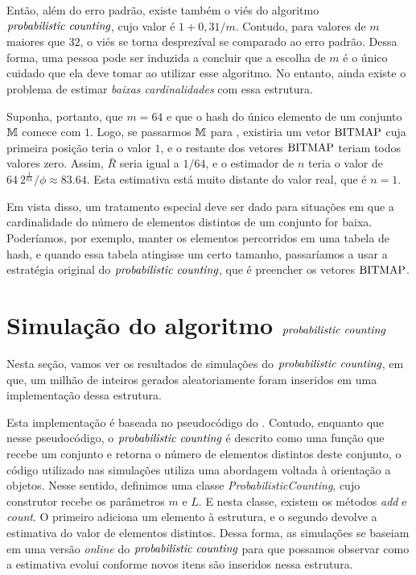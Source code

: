 Então, além do erro padrão, existe também o viés do algoritmo $\textit{probabilistic counting}$, cujo valor é $1 + 0{,}31/m$. Contudo, para 
valores de $m$ maiores que $32$, o viés se torna desprezíval se comparado ao erro padrão. Dessa forma, uma pessoa pode 
ser induzida a concluir que a escolha de $m$ é o único cuidado que ela deve tomar ao utilizar esse algoritmo. No 
entanto, ainda existe o problema de estimar \textit{baixas cardinalidades} com essa estrutura.

Suponha, portanto, que $m = 64$ e que o hash do único elemento de um conjunto $\mathbb{M}$ comece com $1$. Logo, se passarmos 
$\mathbb{M}$ para , existiria um vetor $\text{BITMAP}$ cuja primeira posição teria o valor $1$, e o 
restante dos vetores $\text{BITMAP}$ teriam todos valores zero. Assim, $\bar{R}$ seria igual a $1/64$, e o estimador de $n$ 
teria o valor de $64 \ 2^{\frac{1}{64}}/\phi \approx 83.64$. Esta estimativa está muito distante do valor real, que é 
$n = 1$.

Em vista disso, um tratamento especial deve ser dado para situações em que a cardinalidade do número de elementos 
distintos de um conjunto for baixa. Poderíamos, por exemplo, manter os elementos percorridos em uma tabela de hash, e 
quando essa tabela atingisse um certo tamanho, passaríamos a usar a estratégia original do $\textit{probabilistic counting}$, que é preencher
os vetores $\text{BITMAP}$.  

\section{Simulação do algoritmo $\textit{probabilistic counting}$}

Nesta seção, vamos ver os resultados de simulações do $\textit{probabilistic counting}$, em que, um milhão de inteiros gerados 
aleatoriamente foram inseridos em uma implementação dessa estrutura. 

Esta implementação é baseada no pseudocódigo do . Contudo, enquanto que 
nesse pseudocódigo, o $\textit{probabilistic counting}$ é descrito como uma função que recebe um conjunto e retorna o número de elementos 
distintos deste conjunto, o código utilizado nas simulações utiliza uma abordagem voltada à orientação a objetos. Nesse 
sentido, definimos uma classe \textit{ProbabilisticCounting}, cujo construtor recebe os parâmetros $m$ e $L$. E nesta 
classe, existem os métodos \textit{add} e \textit{count}. O primeiro adiciona um elemento à estrutura, e o segundo 
devolve a estimativa do valor de elementos distintos. Dessa forma, as simulações se baseiam em uma versão 
\textit{online} do $\textit{probabilistic counting}$ para que possamos observar como a estimativa evolui conforme novos itens são inseridos 
nessa estrutura.

